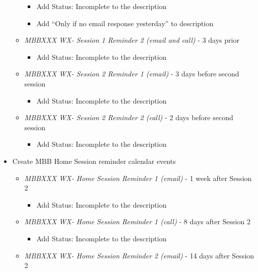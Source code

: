 \documentclass[]{book}
\providecommand{\tightlist}{%
  \setlength{\itemsep}{0pt}\setlength{\parskip}{0pt}}
\begin{document}
\begin{itemize}
\begin{itemize}
    \begin{itemize}
    \tightlist
    \item
      Add Status: Incomplete to the description
    \item
      Add ``Only if no email response yesterday'' to description
    \end{itemize}
  \item
    \emph{MBBXXX WX- Session 1 Reminder 2 (email and call)} - 3 days prior

    \begin{itemize}
    \tightlist
    \item
      Add Status: Incomplete to the description
    \end{itemize}
  \item
    \emph{MBBXXX WX- Session 2 Reminder 1 (email) } - 3 days before second session

    \begin{itemize}
    \tightlist
    \item
      Add Status: Incomplete to the description
    \end{itemize}
  \item
    \emph{MBBXXX WX- Session 2 Reminder 2 (call)} - 2 days before second session

    \begin{itemize}
    \tightlist
    \item
      Add Status: Incomplete to the description
    \end{itemize}
  \end{itemize}
\item
  Create MBB Home Session reminder calendar events

  \begin{itemize}
  \tightlist
  \item
    \emph{MBBXXX WX- Home Session Reminder 1 (email)} - 1 week after Session 2

    \begin{itemize}
    \tightlist
    \item
      Add Status: Incomplete to the description
    \end{itemize}
  \item
    \emph{MBBXXX WX- Home Session Reminder 1 (call)} - 8 days after Session 2

    \begin{itemize}
    \tightlist
    \item
      Add Status: Incomplete to the description
    \end{itemize}
  \item
    \emph{MBBXXX WX- Home Session Reminder 2 (email)} - 14 days after Session 2


\end{itemize}
\end{itemize}
\end{document}
